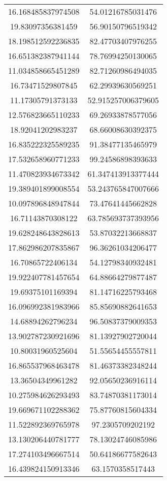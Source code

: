 \begin{table}
\begin{tabular}{cc}
16.168485837974508 & 54.01216785031476 \\
19.83097356381459 & 56.90150796519342 \\
18.198512592236835 & 82.47703407976255 \\
16.651382387941144 & 78.76994250130065 \\
11.034858665451289 & 82.71260986494035 \\
16.73471529807845 & 62.29939630569251 \\
11.17305791373133 & 52.915257006379605 \\
12.576823665110233 & 69.26933878577056 \\
18.92041202983237 & 68.66008630392375 \\
16.835222325589235 & 91.38477135465979 \\
17.532658960771233 & 99.24586898393633 \\
11.470823934673342 & 61.347413913377444 \\
19.389401899008554 & 53.243765847007666 \\
10.097896848947844 & 73.47641445662828 \\
16.71143870308122 & 63.785693737393956 \\
19.628248643828613 & 53.87032213668837 \\
17.862986207835867 & 96.36261034206477 \\
16.70865722406134 & 54.12798340932481 \\
19.922407781457654 & 64.88664279877487 \\
19.69375101169394 & 81.14716225793468 \\
16.096992381983966 & 85.85690882641653 \\
14.68894262796234 & 96.50837379009353 \\
13.902787230921696 & 81.13927902720044 \\
10.80031960525604 & 51.55654455557811 \\
16.865537968463478 & 81.46373382348244 \\
13.36504349961282 & 92.05650236916114 \\
10.275984626293493 & 83.74870381173014 \\
19.669671102288362 & 75.87760815604334 \\
11.522892369765978 & 97.2305709202192 \\
13.130206440781777 & 78.13024746085986 \\
17.274103496667514 & 50.64186677582643 \\
16.439824150913346 & 63.1570358517443 \\

\end{tabular}
\end{table}
